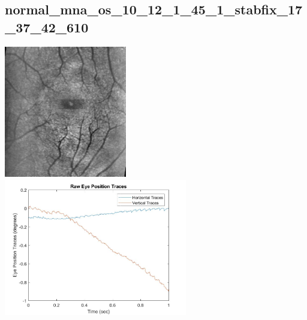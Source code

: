 \documentclass[11pt]{article}
\begin{document}
\subsection{normal\_mna\_os\_10\_12\_1\_45\_1\_stabfix\_17\_37\_42\_610}
\includegraphics[width=0.40\textwidth, valign=m]{referenceframes/tslo_normal/normal_mna_os_10_12_1_45_1_stabfix_17_37_42_610_dwt_nostim_gamscaled_bandfilt_refframe.jpg}
\includegraphics[width=0.60\textwidth, valign=m]{eyepositiontraces/tslo_normal/normal_mna_os_10_12_1_45_1_stabfix_17_37_42_610.jpg}\\
\end{document}
